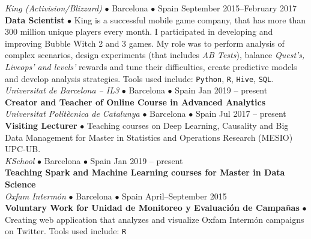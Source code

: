 \documentclass[a4paper, oneside]{scrreprt}
\begin{document}
\vspace{-0.3cm}
\noindent{}
\hspace{-0.15cm}\textit{King (Activision/Blizzard)} $\bullet$ 
Barcelona $\bullet$ Spain \hfill September 2015--February 2017\\
\noindent\textbf{\small Data Scientist } $\bullet$ 
{\small King is a successful mobile game company, that has more
  than 300 million unique players every month. I participated in developing and
  improving Bubble Witch 2 and 3 games. My
  role was to perform analysis of complex scenarios,
  design experiments (that includes \textit{AB Tests}),
  balance \textit{Quest's, Liveops' and levels'}
  rewards and tune their difficulties,
  create predictive models and develop analysis strategies.
  Tools used include: \texttt{Python}, \texttt{R}, \texttt{Hive}, \texttt{SQL}. }\\

\vspace{-0.3cm}
\noindent{}\textit{Universitat de Barcelona -- IL3} $\bullet$ 
Barcelona $\bullet$ Spain \hfill Jan 2019 -- present\\
\noindent\textbf{\small Creator and Teacher of Online Course in Advanced Analytics} \\

\vspace{-0.3cm}
\noindent{}\textit{Universitat Politècnica de Catalunya} $\bullet$ 
Barcelona $\bullet$ Spain \hfill Jul 2017 -- present\\
\noindent\textbf{\small Visiting Lecturer} $\bullet$ Teaching courses on Deep Learning, Causality and
Big Data Management for Master in Statistics and Operations Research (MESIO) UPC-UB. \\

\vspace{-0.3cm}
\noindent{}\textit{KSchool} $\bullet$ 
Barcelona $\bullet$ Spain \hfill Jan 2019 -- present\\
\noindent\textbf{\small Teaching Spark and Machine Learning courses for Master in Data Science} \\

\vspace{-0.3cm}
\noindent{}\textit{Oxfam Intermón} $\bullet$ 
Barcelona $\bullet$ Spain \hfill April--September 2015\\
\noindent\textbf{\small Voluntary Work for Unidad de Monitoreo y Evaluación de Campañas} $\bullet$ 
{\small Creating web application that analyzes and visualize Oxfam Intermón
  campaigns on Twitter.  Tools used
  include: \texttt{R}}\\
\end{document}
